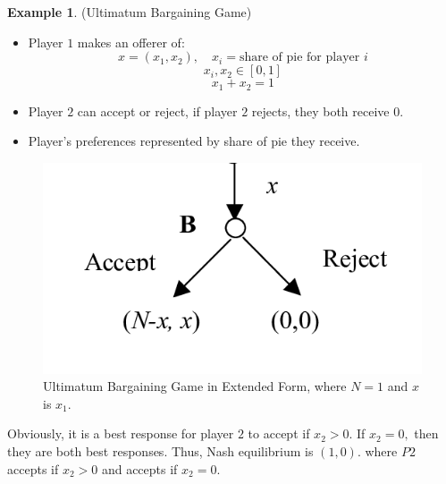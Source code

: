 \documentclass[10pt, oneside]{article}
\theoremstyle{definition}
\newtheorem{exmp}{Example}[section]
\begin{document}
\begin{exmp}
    (Ultimatum Bargaining Game)
    \begin{itemize}
        \item Player $1$ makes an offerer of:
        \[x = (x_1, x_2), \quad x_i = \text{share of pie for player $i$}\]
        \[x_i, x_2 \in [0,1]\]
        \[x_1 + x_2 = 1\]
        \item Player $2$ can accept or reject, if player $2$ rejects, they both receive $0.$
        \item Player's preferences represented by share of pie they receive.
    \end{itemize}
    \begin{figure} [H]
        \centering
        \includegraphics[width=0.5\linewidth]{Images/UBG.png}
        \caption{Ultimatum Bargaining Game in Extended Form, where $N=1$ and $x$ is $x_1.$}
    \end{figure}
    Obviously, it is a best response for player $2$ to accept if $x_2 >0.$ If $x_2 = 0,$ then they are both best responses. Thus, Nash equilibrium is $(1,0).$ where $P2$ accepts if $x_2 >0$ and accepts if $x_2 = 0.$
\end{exmp}

\newpage
\end{document}
